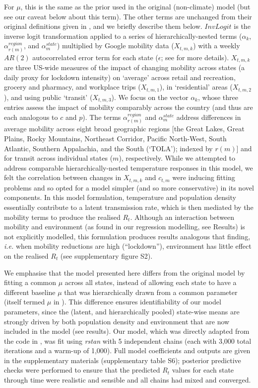 \documentclass[12pt,english,a4paper]{article}
\begin{document}
For $\mu$, this is the same as the prior used in the original (non-climate) model\cite{Unwin2020a} (but see our caveat below about this term). The other terms are unchanged from their original definitions given in \citet{Unwin2020a}, and we briefly describe them below. $InvLogit$ is the inverse logit transformation applied to a series of hierarchically-nested terms ($\alpha_k$, $\alpha_{r(m)}^{region}$, and $\alpha_m^{state}$) multiplied by Google mobility data \cite{Aktay2020} ($X_{t,m,k}$) with a weekly $AR(2)$ autocorrelated error term for each state ($\epsilon$; see \citet{Unwin2020a} for more details). $X_{t,m,k}$ are three US-wide measures of the impact of changing mobility across states (a daily proxy for lockdown intensity) on `average' across retail and recreation, grocery and pharmacy, and workplace trips ($X_{t,m,1}$), in `residential' areas ($X_{t,m,2}$), and using public `transit' ($X_{t,m,3}$).
We focus on the vector $\alpha_k$, whose three entries assess the impact of mobility comparably across the country (and thus are each analogous to $c$ and $p$). The terms $\alpha_{r(m)}^{region}$ and $\alpha_m^{state}$ address differences in average mobility across eight broad geographic regions [the Great Lakes, Great Plains, Rocky Mountains, Northeast Corridor, Pacific North-West, South Atlantic, Southern Appalachia, and the South (`TOLA'); indexed by $r(m)$] and for transit across individual states ($m$), respectively.
While we attempted to address comparable hierarchically-nested temperature responses in this model, we felt the correlation between changes in $X_{t,m,k}$ and $c_{t,m}$ were inducing fitting problems and so opted for a model simpler (and so more conservative) in its novel components.
In this model formulation, temperature and population density essentially contribute to a latent transmission rate, which is then mediated by the mobility terms to produce the realised $R_t$. Although an interaction between mobility and environment (as found in our regression modelling, see Results) is not explicitly modelled, this formulation produces results analogous that finding, \emph{i.e.} when mobility reductions are high (``lockdown''), environment has little effect on the realised $R_t$ (see supplementary figure S2).

We emphasise that the model presented here differs from the original model by fitting a common $\mu$ across all states, instead of allowing each state to have a different baseline $\mu$ that was hierarchically drawn from a common parameter (itself termed $\mu$ in \citet{Unwin2020a}). This difference ensures identifiability of our model parameters, since the (latent, and hierarchically pooled) state-wise means are strongly driven by both population density and environment that are now included in the model (see results). Our model, which was directly adapted from the code in \citet{Unwin2020a}, was fit using \emph{rstan} \cite{rstan2020} with 5 independent chains (each with 3,000 total iterations and a warm-up of 1,000).
Full model coefficients and outputs are given in the supplementary materials (supplementary table S6); posterior predictive checks were performed to ensure that the predicted $R_t$ values for each state through time were realistic and sensible and all chains had mixed and converged.
\end{document}
